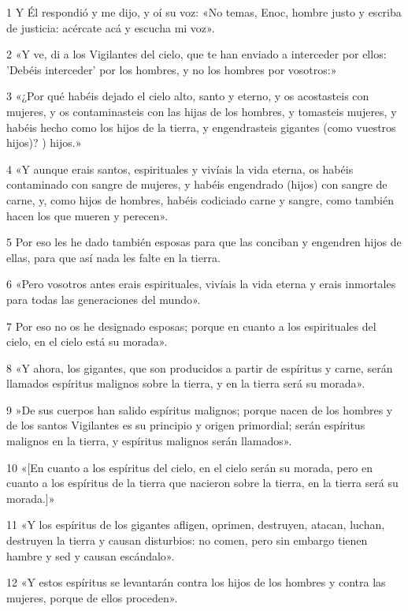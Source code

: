 \par 1 Y Él respondió y me dijo, y oí su voz: «No temas, Enoc, hombre justo y escriba de justicia: acércate acá y escucha mi voz».
\par 2 «Y ve, di a los Vigilantes del cielo, que te han enviado a interceder por ellos: 'Debéis interceder' por los hombres, y no los hombres por vosotros:»
\par 3 «¿Por qué habéis dejado el cielo alto, santo y eterno, y os acostasteis con mujeres, y os contaminasteis con las hijas de los hombres, y tomasteis mujeres, y habéis hecho como los hijos de la tierra, y engendrasteis gigantes (como vuestros hijos)? ) hijos.»
\par 4 «Y aunque erais santos, espirituales y vivíais la vida eterna, os habéis contaminado con sangre de mujeres, y habéis engendrado (hijos) con sangre de carne, y, como hijos de hombres, habéis codiciado carne y sangre, como también hacen los que mueren y perecen».
\par 5 Por eso les he dado también esposas para que las conciban y engendren hijos de ellas, para que así nada les falte en la tierra.
\par 6 «Pero vosotros antes erais espirituales, vivíais la vida eterna y erais inmortales para todas las generaciones del mundo».
\par 7 Por eso no os he designado esposas; porque en cuanto a los espirituales del cielo, en el cielo está su morada».
\par 8 «Y ahora, los gigantes, que son producidos a partir de espíritus y carne, serán llamados espíritus malignos sobre la tierra, y en la tierra será su morada».
\par 9 »De sus cuerpos han salido espíritus malignos; porque nacen de los hombres y de los santos Vigilantes es su principio y origen primordial; serán espíritus malignos en la tierra, y espíritus malignos serán llamados».
\par 10 «[En cuanto a los espíritus del cielo, en el cielo serán su morada, pero en cuanto a los espíritus de la tierra que nacieron sobre la tierra, en la tierra será su morada.]»
\par 11 «Y los espíritus de los gigantes afligen, oprimen, destruyen, atacan, luchan, destruyen la tierra y causan disturbios: no comen, pero sin embargo tienen hambre y sed y causan escándalo».
\par 12 «Y estos espíritus se levantarán contra los hijos de los hombres y contra las mujeres, porque de ellos proceden».

